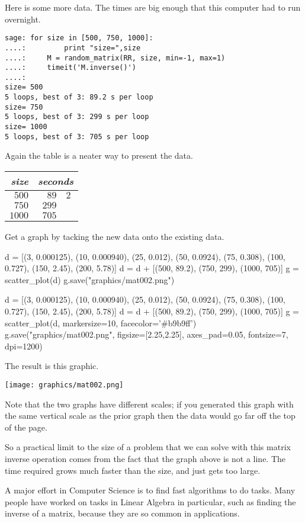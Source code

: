 Here is some more data.
The times are big enough that this computer had to run overnight.
\begin{lstlisting}
sage: for size in [500, 750, 1000]:                             
....:         print "size=",size
....:     M = random_matrix(RR, size, min=-1, max=1)
....:     timeit('M.inverse()')
....: 
size= 500
5 loops, best of 3: 89.2 s per loop
size= 750
5 loops, best of 3: 299 s per loop
size= 1000
5 loops, best of 3: 705 s per loop
\end{lstlisting}
Again the table is a neater way to present the data.
\begin{center}
  \begin{tabular}{r|r@{.}l}
    \textit{size}     &\multicolumn{2}{c}{\textit{seconds}}  \\  \hline
    $500$       &$89$ &$2$ \\
    $750$       &$299$ &   \\
    $1000$      &$705$ &   
  \end{tabular}
\end{center}
Get a graph by tacking the new data onto the existing data.
\begin{sageoutput}[d,0,3]
d = [(3, 0.000125), (10, 0.000940), (25, 0.012),  
     (50, 0.0924), (75, 0.308), (100, 0.727), 
     (150, 2.45), (200, 5.78)]
d = d + [(500, 89.2), (750, 299), (1000, 705)]
g = scatter_plot(d)                           
g.save("graphics/mat002.png")                      
\end{sageoutput}
\begin{sagesilent}
d = [(3, 0.000125), (10, 0.000940), (25, 0.012),  
     (50, 0.0924), (75, 0.308), (100, 0.727), 
     (150, 2.45), (200, 5.78)]
d = d + [(500, 89.2), (750, 299), (1000, 705)]
g = scatter_plot(d, markersize=10, facecolor='#b9b9ff')
g.save("graphics/mat002.png", figsize=[2.25,2.25], axes_pad=0.05, fontsize=7, dpi=1200)              
\end{sagesilent}
The result is this graphic.
\begin{center}
  \texttt{[image: graphics/mat002.png]}
\end{center}
Note that the two graphs have different scales;
if you generated this graph with the same vertical scale as the prior graph
then the data would go far off the top of the page.

So a practical limit to the size of a problem that we can solve with
this matrix inverse operation comes from the fact that the graph above is
not a line.
The time required grows much faster than the size, and just gets too large. 

A major effort in Computer Science is to find fast algorithms to 
do tasks.
Many people have worked on tasks in Linear Algebra in particular,
such as finding the inverse of a matrix, because
they are so common in applications.

\endinput


TODO:

